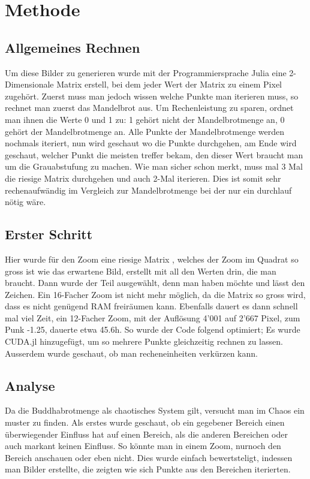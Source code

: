 \section{Methode}
\subsection{Allgemeines Rechnen}
Um diese Bilder zu generieren wurde mit der Programmiersprache Julia eine 2-Dimensionale Matrix erstell, bei dem jeder Wert der Matrix zu einem Pixel zugehört. Zuerst muss man jedoch wissen welche Punkte man iterieren muss, so rechnet man zuerst das Mandelbrot aus. Um Rechenleistung zu sparen, ordnet man ihnen die Werte 0 und 1 zu: 1 gehört nicht der Mandelbrotmenge an, 0 gehört der Mandelbrotmenge an. Alle Punkte der Mandelbrotmenge werden nochmals iteriert, nun wird geschaut wo die Punkte durchgehen, am Ende wird geschaut, welcher Punkt die meisten treffer bekam, den dieser Wert braucht man um die Grauabstufung zu machen. Wie man sicher schon merkt, muss mal 3 Mal die riesige Matrix durchgehen und auch 2-Mal iterieren. Dies ist somit sehr rechenaufwändig im Vergleich zur Mandelbrotmenge bei der nur ein durchlauf nötig wäre.
\subsection{Erster Schritt}
Hier wurde für den Zoom eine riesige Matrix , welches der Zoom im Quadrat so gross ist wie das erwartene Bild, erstellt mit all den Werten drin, die man braucht. Dann wurde der Teil ausgewählt, denn man haben möchte und lässt den Zeichen. Ein 16-Facher Zoom ist nicht mehr möglich, da die Matrix so gross wird, dass es nicht genügend RAM freiräumen kann. Ebenfalls dauert es dann schnell mal viel Zeit, ein 12-Facher Zoom, mit der Auflösung 4'001 auf 2'667 Pixel, zum Punk -1.25, dauerte etwa 45.6h. So wurde der Code folgend optimiert; Es wurde CUDA.jl hinzugefügt, um so mehrere Punkte gleichzeitig rechnen zu lassen. Ausserdem wurde geschaut, ob man recheneinheiten verkürzen kann.
\subsection{Analyse}
Da die Buddhabrotmenge als chaotisches System gilt, versucht man im Chaos ein muster zu finden. Als erstes wurde geschaut, ob ein gegebener Bereich einen überwiegender Einfluss hat auf einen Bereich, als die anderen Bereichen oder auch markant keinen Einfluss. So könnte man in einem Zoom, nurnoch den Bereich anschauen oder eben nicht. Dies wurde einfach bewertsteligt, indessen man Bilder erstellte, die zeigten wie sich Punkte aus den Bereichen iterierten. 